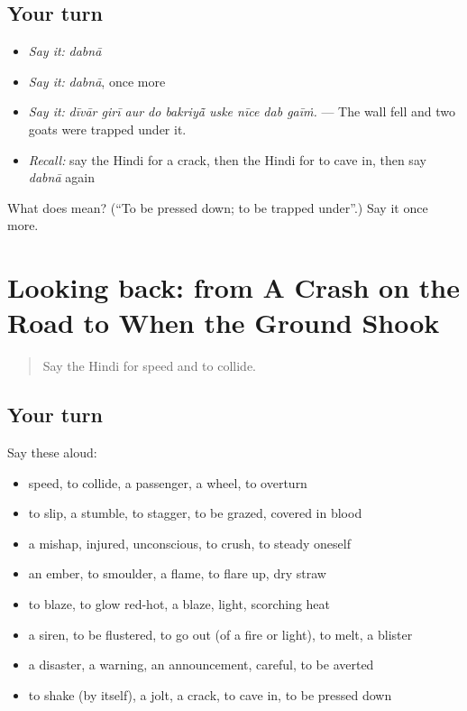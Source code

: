 \subsection*{Your turn}
\begin{itemize}
\raggedright
  \item \emph{Say it:} \emph{dabnā}
  \item \emph{Say it:} \emph{dabnā}, once more
  \item \emph{Say it:} \emph{dīvār girī aur do bakriyā̃ uske nīce dab gaīṁ.} — The wall fell and two goats were trapped under it.
  \item \emph{Recall:} say the Hindi for a crack, then the Hindi for to cave in, then say \emph{dabnā} again
\end{itemize}

\begin{tcolorbox}[breakable,colback=teal!4,colframe=teal!35!black,title={Before you move on}]
What does  mean? (\textquotedblleft{}To be pressed down; to be trapped under\textquotedblright{}.) Say it once more.
\end{tcolorbox}
\section[(dialogue)]{Looking back: from A Crash on the Road to When the Ground Shook}

\label{lesson:HI-R303-review-296-303}



\begin{quote}
Say the Hindi for speed and to collide.
\end{quote}

\subsection*{Your turn}
Say these aloud:

\begin{itemize}
\raggedright
  \item speed, to collide, a passenger, a wheel, to overturn
  \item to slip, a stumble, to stagger, to be grazed, covered in blood
  \item a mishap, injured, unconscious, to crush, to steady oneself
  \item an ember, to smoulder, a flame, to flare up, dry straw
  \item to blaze, to glow red-hot, a blaze, light, scorching heat
  \item a siren, to be flustered, to go out (of a fire or light), to melt, a blister
  \item a disaster, a warning, an announcement, careful, to be averted
  \item to shake (by itself), a jolt, a crack, to cave in, to be pressed down
\end{itemize}

